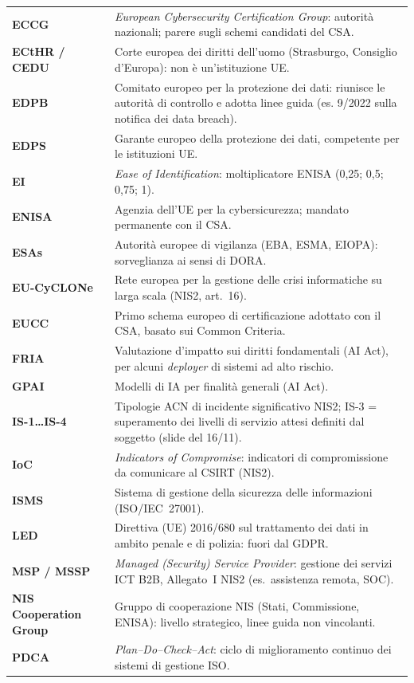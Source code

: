 \begin{longtable}{>{\bfseries}p{}p{}}
ECCG & \emph{European Cybersecurity Certification Group}: autorità nazionali; parere sugli schemi
  candidati del CSA. \\
ECtHR / CEDU & Corte europea dei diritti dell'uomo (Strasburgo, Consiglio d'Europa): non è
  un'istituzione UE. \\
EDPB & Comitato europeo per la protezione dei dati: riunisce le autorità di controllo e adotta linee
  guida (es. 9/2022 sulla notifica dei data breach). \\
EDPS & Garante europeo della protezione dei dati, competente per le istituzioni UE. \\
EI & \emph{Ease of Identification}: moltiplicatore ENISA (0,25; 0,5; 0,75; 1). \\
ENISA & Agenzia dell'UE per la cybersicurezza; mandato permanente con il CSA. \\
ESAs & Autorità europee di vigilanza (EBA, ESMA, EIOPA): sorveglianza ai sensi di DORA. \\
EU-CyCLONe & Rete europea per la gestione delle crisi informatiche su larga scala (NIS2, art.~16). \\
EUCC & Primo schema europeo di certificazione adottato con il CSA, basato sui Common Criteria. \\
FRIA & Valutazione d'impatto sui diritti fondamentali (AI Act), per alcuni \emph{deployer} di sistemi
  ad alto rischio. \\
GPAI & Modelli di IA per finalità generali (AI Act). \\
IS-1\ldots IS-4 & Tipologie ACN di incidente significativo NIS2; IS-3 = superamento dei livelli di
  servizio attesi definiti dal soggetto (slide del 16/11). \\
IoC & \emph{Indicators of Compromise}: indicatori di compromissione da comunicare al CSIRT (NIS2). \\
ISMS & Sistema di gestione della sicurezza delle informazioni (ISO/IEC~27001). \\
LED & Direttiva (UE) 2016/680 sul trattamento dei dati in ambito penale e di polizia: fuori dal GDPR. \\
MSP / MSSP & \emph{Managed (Security) Service Provider}: gestione dei servizi ICT B2B, Allegato~I
  NIS2 (es.\ assistenza remota, SOC). \\
NIS Cooperation Group & Gruppo di cooperazione NIS (Stati, Commissione, ENISA): livello strategico,
  linee guida non vincolanti. \\
PDCA & \emph{Plan--Do--Check--Act}: ciclo di miglioramento continuo dei sistemi di gestione ISO. \\

\end{longtable}
